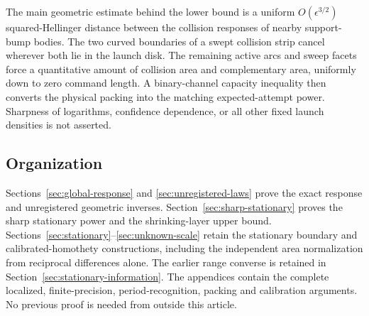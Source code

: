 The main geometric estimate behind the lower bound is a uniform
$O(\epsilon^{3/2})$ squared-Hellinger distance between the collision
responses of nearby support-bump bodies. The two curved boundaries
of a swept collision strip cancel wherever both lie in the launch
disk. The remaining active arcs and sweep facets force a quantitative
amount of collision area and complementary area, uniformly down to
zero command length. A binary-channel capacity inequality then converts
the physical packing into the matching expected-attempt power.
Sharpness of logarithms, confidence dependence, or all other fixed
launch densities is not asserted.

\subsection{Organization}
Sections~\ref{sec:global-response} and \ref{sec:unregistered-laws}
prove the exact response and unregistered geometric inverses.
Section~\ref{sec:sharp-stationary} proves the sharp stationary power
and the shrinking-layer upper bound.
Sections~\ref{sec:stationary}--\ref{sec:unknown-scale} retain the
stationary boundary and calibrated-homothety constructions, including
the independent area normalization from reciprocal differences alone. The earlier range converse is
retained in Section~\ref{sec:stationary-information}. The appendices
contain the complete localized, finite-precision, period-recognition,
packing and calibration arguments. No previous proof is needed from
outside this article.
